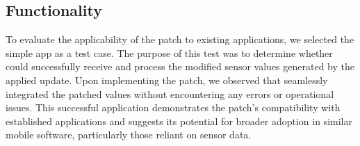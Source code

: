 \documentclass[11pt,
  oneside,openany,    %
]{scrreprt}
\begin{document}
\subsection{Functionality}
\label{subsec:functionality}
To evaluate the applicability of the patch to existing applications, we selected the simple app  as a test case.
The purpose of this test was to determine whether  could successfully receive and process the modified sensor values generated by the applied update.
Upon implementing the patch, we observed that  seamlessly integrated the patched values without encountering any errors or operational issues.
This successful application demonstrates the patch's compatibility with established applications and suggests its potential for broader adoption in similar mobile software, particularly those reliant on sensor data.
\end{document}
